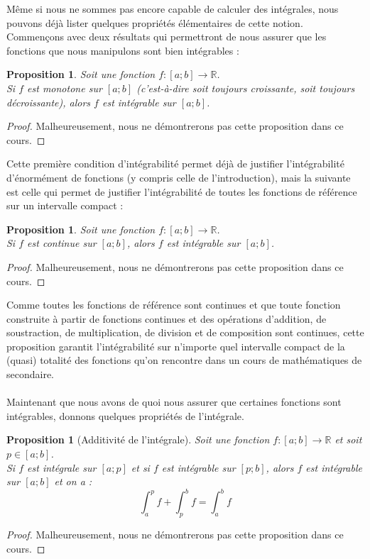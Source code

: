 \documentclass[a4paper,fontsize=13pt]{scrreprt}
\theoremstyle{plain}
\newtheorem{pro}[subsection]{Proposition}
\theoremstyle{definition}
\newcommand{\rr}{\mathbb{R}}
\begin{document}
Même si nous ne sommes pas encore capable de calculer des intégrales, nous pouvons déjà lister quelques propriétés élémentaires de cette notion. \\
Commençons avec deux résultats qui permettront de nous assurer que les fonctions que nous manipulons sont bien intégrables :
\begin{pro}
Soit une fonction $f : [a;b] \to \rr$. \\
Si $f$ est monotone sur $[a;b]$ (c'est-à-dire soit toujours croissante, soit toujours décroissante), alors $f$ est intégrable sur $[a;b]$.
\end{pro}
\begin{proof}
Malheureusement, nous ne démontrerons pas cette proposition dans ce cours.
\end{proof}
Cette première condition d'intégrabilité permet déjà de justifier l'intégrabilité d'énormément de fonctions (y compris celle de l'introduction), mais la suivante est celle qui permet de justifier l'intégrabilité de toutes les fonctions de référence sur un intervalle compact :
\begin{pro}
Soit une fonction $f : [a;b] \to \rr$. \\
Si $f$ est continue sur $[a;b]$, alors $f$ est intégrable sur $[a;b]$.
\end{pro}
\begin{proof}
Malheureusement, nous ne démontrerons pas cette proposition dans ce cours.
\end{proof}
Comme toutes les fonctions de référence sont continues et que toute fonction construite à partir de fonctions continues et des opérations d'addition, de soustraction, de multiplication, de division et de composition sont continues, cette proposition garantit l'intégrabilité sur n'importe quel intervalle compact de la (quasi) totalité des fonctions qu'on rencontre dans un cours de mathématiques de secondaire. \\
~\\
Maintenant que nous avons de quoi nous assurer que certaines fonctions sont intégrables, donnons quelques propriétés de l'intégrale.
\begin{pro} [Additivité de l'intégrale]
Soit une fonction $f : [a;b] \to \rr$ et soit $p \in [a;b]$. \\
Si $f$ est intégrale sur $[a;p]$ et si $f$ est intégrable sur $[p;b]$, alors $f$ est intégrable sur $[a;b]$ et on a :
$$\int_{a}^{p} f + \int_{p}^{b} f = \int_{a}^{b} f$$
\end{pro}
\begin{proof}
Malheureusement, nous ne démontrerons pas cette proposition dans ce cours.
\end{proof}
\end{document}
